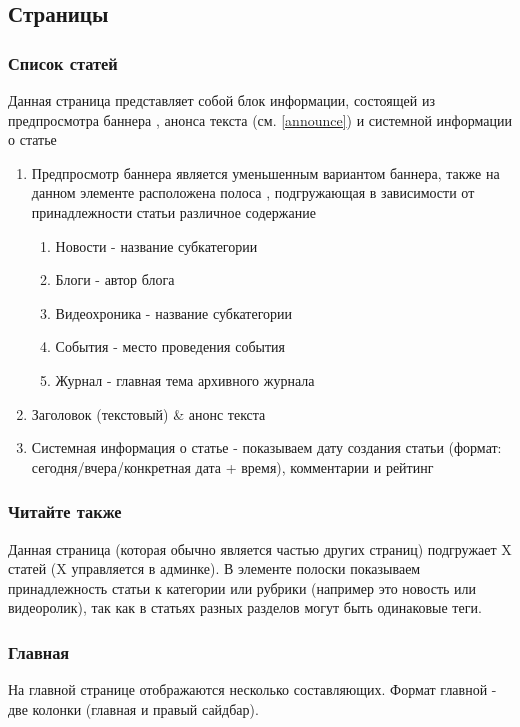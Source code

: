 \documentclass[12pt]{article} %
\begin{document}
\begin{enumerate}
\end{enumerate}

\subsection{Страницы}
\subsubsection{Список статей}
Данная страница представляет собой блок информации, состоящей из предпросмотра баннера , анонса текста (см. \ref{announce}) и системной информации о статье
\begin{enumerate}
    \item Предпросмотр баннера является уменьшенным вариантом баннера, также на данном элементе расположена полоса \label{whiteline}, подгружающая в зависимости от принадлежности статьи различное содержание
    \begin{enumerate}
        \item Новости - название субкатегории
        \item Блоги - автор блога 
        \item Видеохроника - название субкатегории
        \item События - место проведения события
        \item Журнал - главная тема архивного журнала
    \end{enumerate}
    \item Заголовок (текстовый) \& анонс текста
    \item Системная информация о статье - показываем дату создания статьи (формат: сегодня/вчера/конкретная дата + время), комментарии и рейтинг
\end{enumerate}

\subsubsection{Читайте также}
Данная страница (которая обычно является частью других страниц) подгружает X статей (X управляется в админке). В элементе полоски показываем принадлежность статьи к категории или рубрики (например это новость или видеоролик), так как в статьях разных разделов могут быть одинаковые теги. 

\subsubsection{Главная}
На главной странице отображаются несколько составляющих. Формат главной - две колонки (главная и правый сайдбар).
\end{document}

